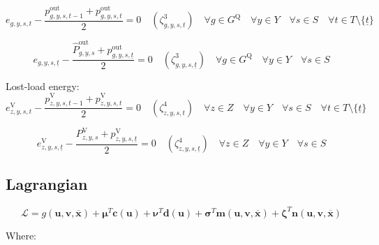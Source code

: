 \documentclass{article}
\newcommand{\sStorage}{G^{\mathrm{Q}}}
\newcommand{\sYears}{Y}
\newcommand{\sScenarios}{S}
\newcommand{\sIntervals}{T}
\newcommand{\sZones}{Z}
\newcommand{\iGenerator}{g}
\newcommand{\iYear}{y}
\newcommand{\iScenario}{s}
\newcommand{\iInterval}{t}
\newcommand{\iIntervalStart}{\underline{\iInterval}}
\newcommand{\iZone}{z}
\newcommand{\cPowerOutInitial}[1][\iGenerator,\iYear,\iScenario]{\hat{P}_{#1}^{\mathrm{out}}}
\newcommand{\cLostLoadPowerInitial}[1][\iZone,\iYear,\iScenario]{P_{#1}^{\mathrm{V}}}
\newcommand{\vEnergy}[1][\iGenerator,\iYear,\iScenario,\iInterval]{e_{#1}}
\newcommand{\vPowerOut}[1][\iGenerator,\iYear,\iScenario,\iInterval]{p^{\mathrm{out}}_{#1}}
\newcommand{\vLostLoadEnergy}[1][\iZone,\iYear,\iScenario,\iInterval]{e^{\mathrm{V}}_{#1}}
\newcommand{\vLostLoadPower}[1][\iZone,\iYear,\iScenario,\iInterval]{p^{\mathrm{V}}_{#1}}
\newcommand{\dStorageEnergyOutput}[1][\iGenerator,\iYear,\iScenario,\iInterval]{\zeta_{#1}^{3}}
\newcommand{\dLostLoadEnergy}[1][\iZone,\iYear,\iScenario,\iInterval]{\zeta_{#1}^{4}}
\begin{document}
\begin{equation}
	\vEnergy - \frac{\vPowerOut[\iGenerator, \iYear,\iScenario,\iInterval-1] + \vPowerOut}{2} = 0 \quad (\dStorageEnergyOutput) \quad \forall \iGenerator \in \sStorage \quad \forall \iYear \in \sYears \quad \forall \iScenario \in \sScenarios  \quad \forall \iInterval \in \sIntervals \setminus \{\iIntervalStart\}
\end{equation}

\begin{equation}
	\vEnergy[\iGenerator, \iYear,\iScenario,\iIntervalStart] - \frac{\cPowerOutInitial + \vPowerOut[\iGenerator, \iYear,\iScenario,\iIntervalStart]}{2} = 0 \quad (\dStorageEnergyOutput[\iGenerator, \iYear,\iScenario,\iIntervalStart]) \quad \forall \iGenerator \in \sStorage \quad \forall \iYear \in \sYears \quad \forall \iScenario \in \sScenarios
\end{equation}

Lost-load energy:
\begin{equation}
	\vLostLoadEnergy - \frac{\vLostLoadPower[\iZone, \iYear,\iScenario,\iInterval-1] + \vLostLoadPower}{2} = 0 \quad (\dLostLoadEnergy) \quad \forall \iZone \in \sZones \quad \forall \iYear \in \sYears \quad \forall \iScenario \in \sScenarios \quad \forall \iInterval \in \sIntervals \setminus \{\iIntervalStart\}
\end{equation}

\begin{equation}
	\vLostLoadEnergy[\iZone, \iYear,\iScenario,\iIntervalStart] - \frac{\cLostLoadPowerInitial + \vLostLoadPower[\iZone, \iYear,\iScenario,\iIntervalStart]}{2} = 0 \quad (\dLostLoadEnergy[\iZone, \iYear,\iScenario,\iIntervalStart]) \quad \forall \iZone \in \sZones \quad \forall \iYear \in \sYears \quad \forall \iScenario \in \sScenarios
\end{equation}

\subsection{Lagrangian}

\begin{equation}
	\mathcal{L} = g(\bm{u}, \bm{v}, \overline{\bm{x}}) + \bm{\mu}^{T}\bm{c}(\bm{u}) + \bm{\nu}^{T}\bm{d}(\bm{u}) + \bm{\sigma}^{T}\bm{m}(\bm{u}, \bm{v}, \bm{\overline{x}}) + \bm{\zeta}^{T} \bm{n}(\bm{u}, \bm{v}, \bm{\overline{x}})
\end{equation}

Where:
\end{document}
